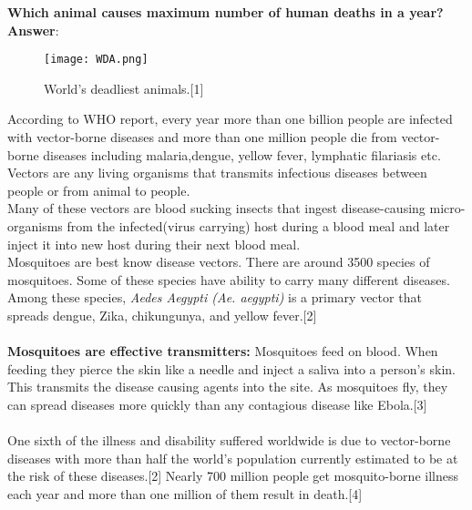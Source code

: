 \documentclass[11pt]{exam}
\begin{document}
\begin{questions}
\question
\label{Q1:Most lethal animal}
\textbf{Which animal causes maximum number of human deaths in a year?}  \\
\textbf{Answer}:
\begin{figure}[H]
  \centering
   \texttt{[image: WDA.png]}
  \caption{World's deadliest animals.[1]}
   \label{fig: World's deadliest animals }
\end{figure}
According to WHO report, every year more than one billion people are infected with vector-borne diseases and more than one million people die from vector-borne diseases including malaria,dengue, yellow fever, lymphatic filariasis etc. \\
Vectors are any living organisms that transmits infectious diseases between people or from animal to people.\\ %
Many of these vectors are blood sucking insects that ingest disease-causing micro-organisms from the infected(virus carrying) host during a blood meal and later inject it into new host during their next blood meal.     \\
Mosquitoes are best know disease vectors. There are around 3500 species of mosquitoes. Some of these species have ability to carry many different diseases.\\
Among these species, \textit{Aedes Aegypti (Ae. aegypti)} is a primary vector that spreads dengue, Zika, chikungunya, and yellow fever.[2]\\ \\
\textbf{Mosquitoes are effective transmitters:} Mosquitoes feed on blood. When feeding they pierce the skin like a needle and inject a saliva into a person's skin. This transmits the disease causing agents into the site. As mosquitoes fly, they can spread diseases more quickly than any contagious disease like Ebola.[3] \\ \\
One sixth of the illness and disability suffered worldwide is due to vector-borne diseases with more than half the world's population currently estimated to be at the risk of these diseases.[2]  
Nearly 700 million people get mosquito-borne illness each year and more than one million of them result in death.[4] \\ 


\end{questions}
\end{document}
